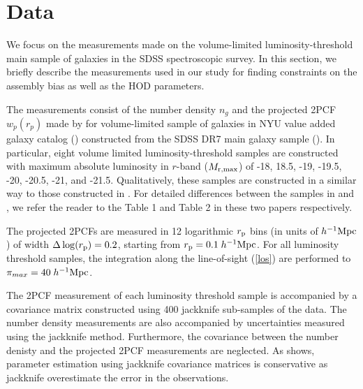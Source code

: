 \section{Data}\label{sec:data}

We focus on the measurements made on the volume-limited luminosity-threshold main sample of galaxies in the SDSS spectroscopic survey. In this section, we briefly describe the measurements used in our study for finding constraints on the assembly bias as well as the HOD parameters.

The measurements consist of the number density $n_{g}$ and the projected 2PCF $w_{p}(r_{p})$ made by \citealt{guo2015} for volume-limited sample of galaxies in NYU value added galaxy catalog (\citealt{Blanton2005}) constructed from the SDSS DR7 main galaxy sample (\citealt{abazajian2009}). In particular, eight volume limited luminosity-threshold samples are constructed with maximum absolute luminosity in $r$-band ($M_{\rm r,max}$) of -18, 18.5, -19, -19.5, -20, -20.5, -21, and -21.5. Qualitatively, these samples are constructed in a similar way to those constructed in \citealt{zehavi2011}. For detailed differences between the samples in \citealt{guo2015} and \citealt{zehavi2011}, we refer the reader to the Table 1 and Table 2 in these two papers respectively. 


The projected 2PCFs are measured in 12 logarithmic $r_{\rm p}$ bins (in units of $h^{-1}\rm{Mpc}$) of width $\Delta \log(r_{\rm p}) = 0.2$, starting from $r_{\rm{p}} = 0.1 \; h^{-1}\rm{Mpc}$. For all luminosity threshold samples, the integration along the line-of-sight (\ref{los}) are performed to $\pi_{max}=40 \; h^{-1}\rm{Mpc}$. 

The 2PCF measurement of each luminosity threshold sample is accompanied by a covariance matrix constructed using 400 jackknife sub-samples of the data. The number density measurements are also accompanied by uncertainties measured using the jackknife method. Furthermore, the covariance between the number denisty and the projected 2PCF measurements are neglected. As \citealt{norberg} shows, parameter estimation using jackknife covariance matrices is conservative as jackknife overestimate the error in the observations. 

